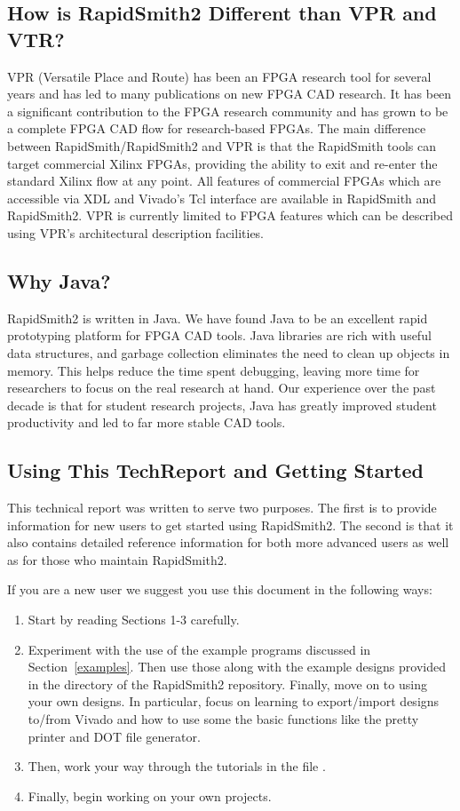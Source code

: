 \subsection{How is RapidSmith2 Different than VPR and VTR?}
VPR (Versatile Place and Route) has been an FPGA research tool for several years
and has led to many publications on new FPGA CAD research. It has been a
significant contribution to the FPGA research community and has grown to be a
complete FPGA CAD flow for research-based FPGAs. The main difference between
RapidSmith/RapidSmith2 and VPR is that the RapidSmith tools can target commercial Xilinx
FPGAs, providing the ability to exit and re-enter the standard Xilinx flow at
any point.  All features of commercial FPGAs which are accessible via XDL and
Vivado's Tcl interface are available in RapidSmith and RapidSmith2. VPR is currently
limited to FPGA features which can be described using VPR's architectural
description facilities.

\subsection{Why Java?}
RapidSmith2 is written in Java. We have found Java to be an excellent rapid prototyping
platform for FPGA CAD tools.  Java libraries are rich with useful data
structures, and garbage collection eliminates the need to clean up objects in
memory. This helps reduce the time spent debugging, leaving more
time for researchers to focus on the real research at hand.  Our experience over
the past decade is that for student research projects, Java has greatly improved
student productivity and led to far more stable CAD tools.

\subsection{Using This TechReport and Getting Started}
This technical report was written to serve two purposes.  The first is to
provide information for new users to get started using RapidSmith2.  The second
is that it also contains detailed reference information for both more advanced
users as well as for those who maintain RapidSmith2.  

If you are a new user we suggest you use this document in the following ways:

\begin{enumerate}
  \item Start by reading Sections 1-3 carefully.
  \item Experiment with the use of the example programs discussed in
  Section~\ref{examples}.  Then use those along with the example designs
  provided in the  directory of the RapidSmith2
  repository.  Finally, move on to using your own designs.
  In particular, focus on learning to export/import designs to/from Vivado and
  how to use some the basic functions like the pretty printer and DOT file
  generator.
  \item Then, work your way through the tutorials in the file
  .
  \item Finally, begin working on your own projects.
\end{enumerate}

